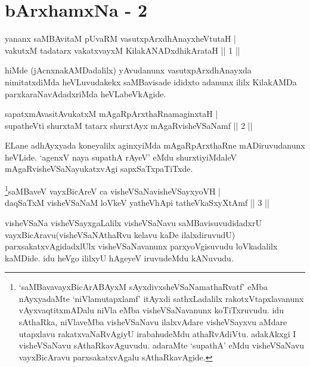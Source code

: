 \chapter{bArxhamxNa - 2}


\begin{shl}
yananx saMBAvitaM pUvaRM vasutxpArxdhAnayxheVtutaH | \\
vakutxM tadatarx vakatxvayxM KilakANADxdhikArataH \hfill|| 1 || 
\end{shl}

\begin{artha}
hiMde (jAcnxnakAMDadalilx) yAvudanunx vasutxpArxdhAnayxda 
nimitatxdiMda heVLuvudakekx saMBavisade ididxto adanunx ililx 
KilakAMDa parxkaraNavAdadxriMda heVLabeVkAgide.
\end{artha}

\begin{shl}
sapatxmAvasitAvukatxM mAgaRpArxthaRnamaginxtaH | \\
supatheVti shurxtaM tatarx shurxtAyx mAgaRvisheVSaNamf \hfill|| 2 || 
\end{shl}

\begin{artha}
ELane adhAyxyada koneyalilx aginxyiMda mAgaRpArxthaRne mADiruvudanunx 
heVLide. `agenxV naya supathA rAyeV' eMdu shurxtiyiMdaleV mAgaRvisheVSaNayukatxvAgi sapxSaTxpaTiTxde.
\end{artha}



\begin{shl}
\footnote{`saMBavavayxBicArABAyxM sAyxdivxsheVSaNamathaRvatf' eMba  nAyxyadaMte `niVlamutapxlamf' itAyxdi sathxLadalilx  rakotxVtapxlavanunx vAyxvaqtitxmADalu niVla eMba visheVSaNavanunx  koTiTxruvudu. idu sAthaRka, niVlaveMba visheVSaNavu ilalxvAdare  visheVSayxvu aMdare utapxlavu rakatxvaNaRvAgiyU irabahudeMdu  athaRvAdiVtu. adakAkxgi I visheVSaNavu sAthaRkavAguvudu. adaraMte  `supathA' eMdu visheVSaNavu vayxBicAravu parxsakatxvAgalu  sAthaRkavAgide.}saMBaveV vayxBicAreV ca visheVSaNavisheVSayxyoVH | \\
daqSaTxM visheVSaNaM loVkeV yatheVhApi tatheVkaSxyXtAmf \hfill|| 3 || 
\end{shl}

\begin{artha}
visheVSaNa visheVSayxgaLalilx visheVSaNavu saMBavisuvudidadxrU 
vayxBicAravu\break (visheVSaNAthaRvu kelavu kaDe ilalxdiruvudU) 
parxsakatxvAgidadxlUlx visheVSaNavanunx parxyoVgisuvudu loVkadalilx 
kaMDide. idu heVgo ililxyU hAgeyeV iruvudeMdu kANuvudu.
\end{artha}

